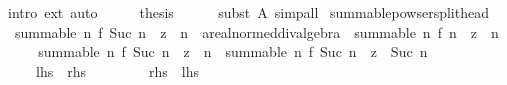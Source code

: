 \begin{isabellebody}
\ {\isacharparenleft}{\kern0pt}intro\ ext{\isacharparenright}{\kern0pt}\ auto\isanewline
\ \ \isamarkupfalse%
\ \isamarkupfalse%
\ {\isacharquery}{\kern0pt}thesis\isanewline
\ \ \ \ \isamarkupfalse%
\ {\isacharparenleft}{\kern0pt}subst\ A{\isacharparenright}{\kern0pt}\ simp{\isacharunderscore}{\kern0pt}all\isanewline
{}\isamarkupfalse%
%
\endisatagproof
{\isafoldproof}%
%
\isadelimproof
\isanewline
%
\endisadelimproof
\isanewline
{}\isamarkupfalse%
\ summable{\isacharunderscore}{\kern0pt}powser{\isacharunderscore}{\kern0pt}split{\isacharunderscore}{\kern0pt}head{\isacharcolon}{\kern0pt}\isanewline
\ \ {\isachardoublequoteopen}summable\ {\isacharparenleft}{\kern0pt}{\isasymlambda}n{\isachardot}{\kern0pt}\ f\ {\isacharparenleft}{\kern0pt}Suc\ n{\isacharparenright}{\kern0pt}\ {\isacharasterisk}{\kern0pt}\ z\ {\isacharcircum}{\kern0pt}\ n\ {\isacharcolon}{\kern0pt}{\isacharcolon}{\kern0pt}\ {\isacharprime}{\kern0pt}a{\isacharcolon}{\kern0pt}{\isacharcolon}{\kern0pt}real{\isacharunderscore}{\kern0pt}normed{\isacharunderscore}{\kern0pt}div{\isacharunderscore}{\kern0pt}algebra{\isacharparenright}{\kern0pt}\ {\isacharequal}{\kern0pt}\ summable\ {\isacharparenleft}{\kern0pt}{\isasymlambda}n{\isachardot}{\kern0pt}\ f\ n\ {\isacharasterisk}{\kern0pt}\ z\ {\isacharcircum}{\kern0pt}\ n{\isacharparenright}{\kern0pt}{\isachardoublequoteclose}\isanewline
%
\isadelimproof
%
\endisadelimproof
%
\isatagproof
{}\isamarkupfalse%
\ {\isacharminus}{\kern0pt}\isanewline
\ \ \isamarkupfalse%
\ {\isachardoublequoteopen}summable\ {\isacharparenleft}{\kern0pt}{\isasymlambda}n{\isachardot}{\kern0pt}\ f\ {\isacharparenleft}{\kern0pt}Suc\ n{\isacharparenright}{\kern0pt}\ {\isacharasterisk}{\kern0pt}\ z\ {\isacharcircum}{\kern0pt}\ n{\isacharparenright}{\kern0pt}\ {\isasymlongleftrightarrow}\ summable\ {\isacharparenleft}{\kern0pt}{\isasymlambda}n{\isachardot}{\kern0pt}\ f\ {\isacharparenleft}{\kern0pt}Suc\ n{\isacharparenright}{\kern0pt}\ {\isacharasterisk}{\kern0pt}\ z\ {\isacharcircum}{\kern0pt}\ Suc\ n{\isacharparenright}{\kern0pt}{\isachardoublequoteclose}\isanewline
\ \ \ \ {\isacharparenleft}{\kern0pt}\ {\isachardoublequoteopen}{\isacharquery}{\kern0pt}lhs\ {\isasymlongleftrightarrow}\ {\isacharquery}{\kern0pt}rhs{\isachardoublequoteclose}{\isacharparenright}{\kern0pt}\isanewline
\ \ \isamarkupfalse%
\isanewline
\ \ \ \ \isamarkupfalse%
\ {\isacharquery}{\kern0pt}rhs\ \ {\isacharquery}{\kern0pt}lhs\isanewline

\end{isabellebody}
